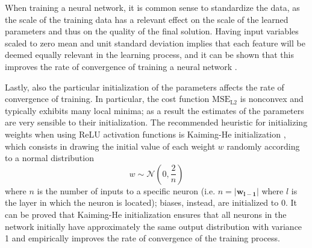 When training a neural network, it is common sense to standardize the data, as the scale of the training data has a relevant effect on the scale of the learned parameters and thus on the quality of the final solution. Having input variables scaled to zero mean and unit standard deviation implies that each feature will be deemed equally relevant in the learning process, and it can be shown that this improves the rate of convergence of training a neural network \cite{nn_standardization}.

Lastly, also the particular initialization of the parameters affects the rate of convergence of training. In particular, the cost function $\text{MSE}_\text{L2}$ is nonconvex and typically exhibits many local minima; as a result the estimates of the parameters are very sensible to their initialization. The recommended heuristic for initializing weights when using ReLU activation functions is Kaiming-He initialization \cite{relu_and_initialization}, which consists in drawing the initial value of each weight $w$ randomly according to a normal distribution
\[
w \sim \mathcal{N}\left(0,\frac{2}{n}\right)
\]
where $n$ is the number of inputs to a specific neuron (i.e. $n = |\mathbf{w_{l-1}}|$ where $l$ is the layer in which the neuron is located); biases, instead, are initialized to 0.
It can be proved that Kaiming-He initialization ensures that all neurons in the network initially have approximately the same output distribution with variance 1 and empirically improves the rate of convergence of the training process.





